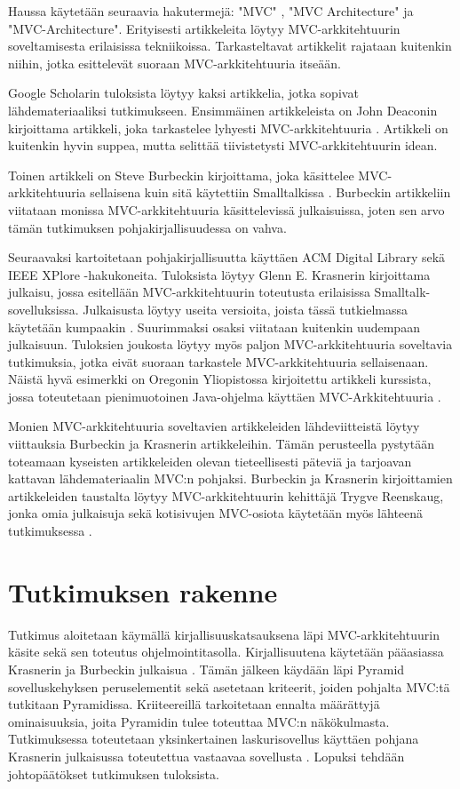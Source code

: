 \documentclass[finnish,utf8,nonumbib,palatino,kandi]{gradu2}
\begin{document}
Haussa käytetään seuraavia hakutermejä: "MVC" , "MVC Architecture" ja "MVC-Architecture".  Erityisesti
artikkeleita löytyy MVC-arkkitehtuurin soveltamisesta erilaisissa tekniikoissa. Tarkasteltavat artikkelit rajataan kuitenkin niihin, jotka esittelevät suoraan MVC-arkkitehtuuria itseään.

Google Scholarin tuloksista löytyy kaksi artikkelia, jotka sopivat
lähdemateriaaliksi tutkimukseen. Ensimmäinen artikkeleista on John Deaconin kirjoittama artikkeli, joka
tarkastelee lyhyesti MVC-arkkitehtuuria \cite{Deacon:1995}. Artikkeli on kuitenkin hyvin suppea, mutta
selittää tiivistetysti MVC-arkkitehtuurin idean.

Toinen artikkeli on Steve Burbeckin kirjoittama, joka käsittelee MVC-arkkitehtuuria sellaisena kuin
sitä käytettiin Smalltalkissa \cite{Burbeck}. Burbeckin artikkeliin viitataan
monissa MVC-arkkitehtuuria käsittelevissä julkaisuissa, joten sen arvo tämän tutkimuksen pohjakirjallisuudessa on vahva.

Seuraavaksi kartoitetaan pohjakirjallisuutta käyttäen ACM Digital Library sekä IEEE XPlore -hakukoneita. Tuloksista löytyy Glenn E.
Krasnerin kirjoittama julkaisu, jossa esitellään MVC-arkkitehtuurin toteutusta erilaisissa Smalltalk-sovelluksissa. Julkaisusta löytyy useita versioita, joista tässä tutkielmassa käytetään kumpaakin \cite{Krasner} \cite{Krasner:desc}.  Suurimmaksi osaksi viitataan kuitenkin uudempaan julkaisuun. Tuloksien joukosta
löytyy myös paljon MVC-arkkitehtuuria soveltavia tutkimuksia, jotka eivät suoraan tarkastele MVC-arkkitehtuuria sellaisenaan. Näistä hyvä esimerkki on
Oregonin Yliopistossa kirjoitettu artikkeli kurssista, jossa toteutetaan pienimuotoinen Java-ohjelma käyttäen MVC-Arkkitehtuuria \cite{Morse}.

Monien MVC-arkkitehtuuria soveltavien artikkeleiden lähdeviitteistä löytyy viittauksia Burbeckin ja Krasnerin artikkeleihin. Tämän perusteella pystytään
toteamaan kyseisten artikkeleiden olevan tieteellisesti päteviä ja tarjoavan kattavan lähdemateriaalin MVC:n pohjaksi. Burbeckin ja Krasnerin kirjoittamien artikkeleiden taustalta löytyy
MVC-arkkitehtuurin kehittäjä Trygve Reenskaug, jonka omia julkaisuja sekä kotisivujen MVC-osiota
käytetään myös lähteenä tutkimuksessa \cite{Reenskaug}.

\section {Tutkimuksen rakenne}
Tutkimus aloitetaan käymällä kirjallisuuskatsauksena läpi MVC-arkkitehtuurin käsite sekä sen toteutus ohjelmointitasolla. Kirjallisuutena käytetään
pääasiassa Krasnerin ja Burbeckin julkaisua \cite{Krasner:desc, Burbeck}. Tämän jälkeen käydään läpi Pyramid sovelluskehyksen peruselementit sekä asetetaan
kriteerit, joiden pohjalta MVC:tä tutkitaan Pyramidissa. Kriiteereillä tarkoitetaan ennalta määrättyjä ominaisuuksia, joita Pyramidin tulee toteuttaa MVC:n näkökulmasta.  Tutkimuksessa toteutetaan yksinkertainen laskurisovellus käyttäen pohjana
Krasnerin julkaisussa toteutettua vastaavaa sovellusta \cite{Krasner:desc}. Lopuksi tehdään johtopäätökset tutkimuksen tuloksista.
\end{document}
